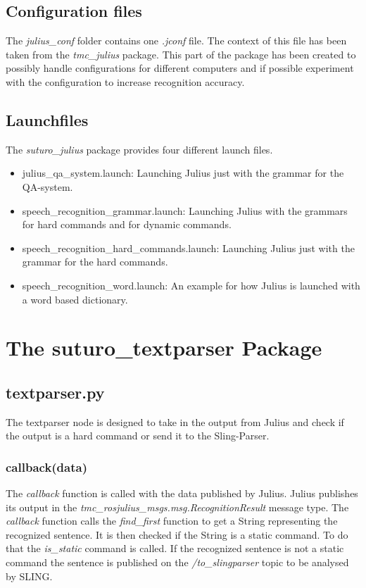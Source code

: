\documentclass[main.tex]{subfiles}
\begin{document}
    \subsection{Configuration files}
        The \textit{julius\_conf} folder contains one \textit{.jconf} file. The context of this file has been taken from the \textit{tmc\_julius} package. This part of the package has been created to possibly handle configurations for different computers and if possible experiment with the configuration to increase recognition accuracy.
    \subsection{Launchfiles}
        The \textit{suturo\_julius} package provides four different launch files.\\
        \begin{itemize}
            \item julius\_qa\_system.launch:
            \subitem Launching Julius just with the grammar for the QA-system.
            \item speech\_recognition\_grammar.launch:
            \subitem Launching Julius with the grammars for hard commands and for dynamic commands.
            \item speech\_recognition\_hard\_commands.launch:
            \subitem Launching Julius just with the grammar for the hard commands.
            \item speech\_recognition\_word.launch:
            \subitem An example for how Julius is launched with a word based dictionary.
        \end{itemize}

\section{The suturo\_textparser Package}
    \subsection{textparser.py}
        The textparser node is designed to take in the output from Julius and check if the output is a hard command or send it to the Sling-Parser.
        \subsubsection{callback(data)}
            The \textit{callback} function is called with the data published by Julius. Julius publishes its output in the \textit{tmc\_rosjulius\_msgs.msg.RecognitionResult} message type. The \textit{callback} function calls the \textit{find\_first} function to get a String representing the recognized sentence. It is then checked if the String is a static command. To do that the \textit{is\_static} command is called. If the recognized sentence is not a static command the sentence is published on the \textit{/to\_slingparser} topic to be analysed by SLING.
    
\end{document}

